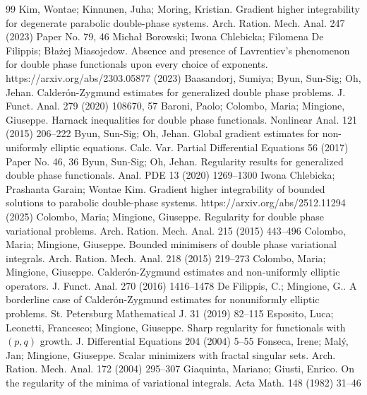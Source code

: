 \documentclass[10pt,a4paper]{amsart}
\numberwithin{equation}{section}
\begin{document}
\begin{thebibliography}{99}
 Kim, Wontae; Kinnunen, Juha; Moring, Kristian. Gradient higher integrability for degenerate parabolic double-phase systems. Arch. Ration. Mech. Anal. 247 (2023) Paper No. 79, 46
 Michał Borowski; Iwona Chlebicka; Filomena De Filippis; Błażej Miasojedow. Absence and presence of Lavrentiev's phenomenon for double phase functionals upon every choice of exponents. https://arxiv.org/abs/2303.05877 (2023)
 Baasandorj, Sumiya; Byun, Sun-Sig; Oh, Jehan. Calder\'{o}n-{Z}ygmund estimates for generalized double phase problems. J. Funct. Anal. 279 (2020) 108670, 57
 Baroni, Paolo; Colombo, Maria; Mingione, Giuseppe. Harnack inequalities for double phase functionals. Nonlinear Anal. 121 (2015) 206--222
 Byun, Sun-Sig; Oh, Jehan. Global gradient estimates for non-uniformly elliptic equations. Calc. Var. Partial Differential Equations 56 (2017) Paper No. 46, 36
 Byun, Sun-Sig; Oh, Jehan. Regularity results for generalized double phase functionals. Anal. PDE 13 (2020) 1269--1300
 Iwona Chlebicka; Prashanta Garain; Wontae Kim. Gradient higher integrability of bounded solutions to parabolic double-phase systems. https://arxiv.org/abs/2512.11294 (2025)
 Colombo, Maria; Mingione, Giuseppe. Regularity for double phase variational problems. Arch. Ration. Mech. Anal. 215 (2015) 443--496
 Colombo, Maria; Mingione, Giuseppe. Bounded minimisers of double phase variational integrals. Arch. Ration. Mech. Anal. 218 (2015) 219--273
 Colombo, Maria; Mingione, Giuseppe. Calder\'{o}n-{Z}ygmund estimates and non-uniformly elliptic operators. J. Funct. Anal. 270 (2016) 1416--1478
 De Filippis, C.; Mingione, G.. A borderline case of {C}alder\'{o}n-{Z}ygmund estimates for nonuniformly elliptic problems. St. Petersburg Mathematical J. 31 (2019) 82--115
 Esposito, Luca; Leonetti, Francesco; Mingione, Giuseppe. Sharp regularity for functionals with {$(p,q)$} growth. J. Differential Equations 204 (2004) 5--55
 Fonseca, Irene; Mal\'{y}, Jan; Mingione, Giuseppe. Scalar minimizers with fractal singular sets. Arch. Ration. Mech. Anal. 172 (2004) 295--307
 Giaquinta, Mariano; Giusti, Enrico. On the regularity of the minima of variational integrals. Acta Math. 148 (1982) 31--46

\end{thebibliography}
\end{document}
